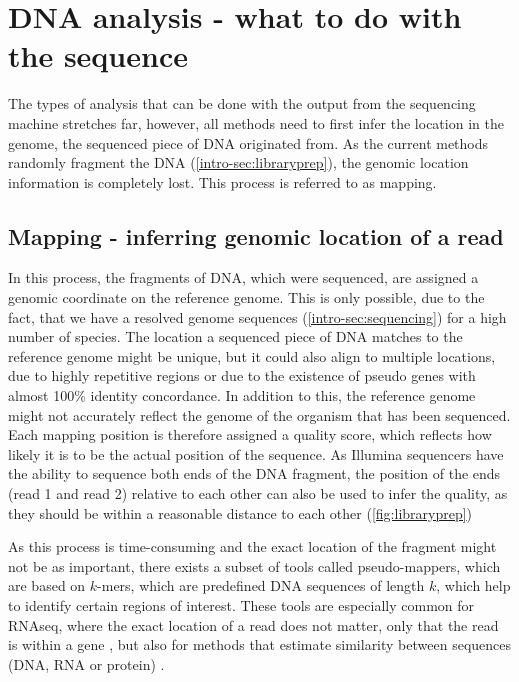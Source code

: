 \section[DNA analysis]{DNA analysis - what to do with the sequence}
\label{intro-sec:analysis}
The types of analysis that can be done with the output from the sequencing machine stretches far,  however, all methods need to first infer the location in the genome, the sequenced piece of DNA originated from. As the current methods randomly fragment the DNA (\autoref{intro-sec:libraryprep}), the genomic location information is completely lost. This process is referred to as mapping.

\subsection[Mapping]{Mapping - inferring genomic location of a read}
\label{intro-sec:mapping}
In this process, the fragments of DNA, which were sequenced, are assigned a genomic coordinate on the reference genome. This is only possible, due to the fact, that we have a resolved genome sequences (\autoref{intro-sec:sequencing}) for a high number of species. The location a sequenced piece of DNA matches to the reference genome might be unique, but it could also align to multiple locations, due to highly repetitive regions or due to the existence of pseudo genes with almost 100\% identity concordance. In addition to this, the reference genome might not accurately reflect the genome of the organism that has been sequenced. Each mapping position is therefore assigned a quality score, which reflects how likely it is to be the actual position of the sequence. As Illumina sequencers have the ability to sequence both ends of the DNA fragment, the position of the ends (read 1 and read 2) relative to each other can also be used to infer the quality, as they should be within a reasonable distance to each other (\autoref{fig:libraryprep})

As this process is time-consuming and the exact location of the fragment might not be as important, there exists a subset of tools called pseudo-mappers, which are based on $k$-mers, which are predefined DNA sequences of length $k$, which help to identify certain regions of interest. These tools are especially common for RNAseq, where the exact location of a read does not matter, only that the read is within a gene \cite{Bray2016,Patro2017}, but also for methods that estimate similarity between sequences (DNA, RNA or protein) \cite{Ondov2016,Luczak2017}.

